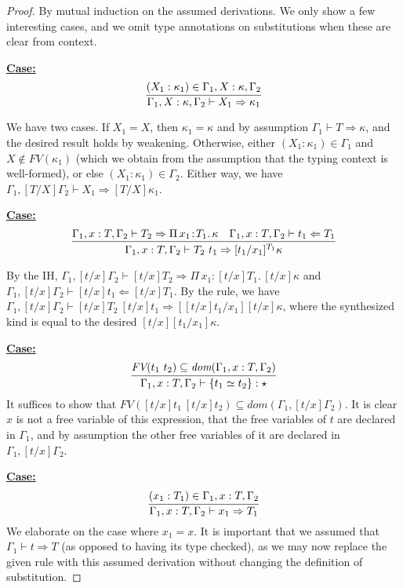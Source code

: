 \documentclass{article}
\newcommand{\abs}[4]{{#1}\, #2\! : \! #3.\, #4}
\newcommand{\tpcheck}[0]{\Leftarrow}
\newcommand{\tpsynth}[0]{\Rightarrow}
\newcommand{\startcase}[1]{\vspace{#1} \noindent\textbf{\underline{Case:}}}
\begin{document}
\begin{proof}
  By mutual induction on the assumed derivations.
  We only show a few interesting cases, and we omit type annotations on
  substitutions when these are clear from context.
  
  \startcase{.2cm}
  \[
    \infer{\Gamma_1,X:\kappa,\Gamma_2 \vdash X_1 \tpsynth \kappa_1}{(X_1 : \kappa_1) \in \Gamma_1,X:\kappa,\Gamma_2}
  \]

  We have two cases.
  If \(X_1 = X\), then \(\kappa_1 = \kappa\) and by assumption \(\Gamma_1 \vdash
  T \tpsynth \kappa\), and the desired result holds by weakening.
  Otherwise, either \((X_1 : \kappa_1) \in \Gamma_1\) and \(X \notin
  \textit{FV}(\kappa_1)\) (which we obtain from the assumption that the typing
  context is well-formed), or else \((X_1 : \kappa_1) \in \Gamma_2\). 
  Either way, we have \(\Gamma_1,[T/X]\Gamma_2 \vdash X_1 \tpsynth
  [T/X]\kappa_1\).

  \startcase{.2cm}
  \[ \infer{\Gamma_1,x:T,\Gamma_2\vdash T_2\ t_1 \tpsynth [t_1/x_1]^{T_1}\kappa
    }{
      \Gamma_1,x:T,\Gamma_2\vdash T_2 \tpsynth \abs{\Pi}{x_1}{T_1}{\kappa}
      & \Gamma_1,x:T,\Gamma_2\vdash t_1 \tpcheck T_1
    }
  \]

  By the IH, \(\Gamma_1,[t/x]\Gamma_2 \vdash [t/x]T_2 \tpsynth
  \abs{\Pi}{x_1}{[t/x]T_1}{[t/x]\kappa}\) and \(\Gamma_1,[t/x]\Gamma_2 \vdash
  [t/x]t_1 \tpcheck [t/x]T_1\).
  By the rule, we have \(\Gamma_1,[t/x]\Gamma_2 \vdash [t/x]T_2\ [t/x]t_1
  \tpsynth [[t/x]t_1/x_1][t/x]\kappa\), where the synthesized kind is equal to
  the desired \([t/x][t_1/x_1]\kappa\).

  \startcase{.2cm}
  \[
    \infer{
      \Gamma_1,x:T,\Gamma_2\vdash \{ t_1 \simeq t_2 \} : \star
    }{
      \textit{FV}(t_1\ t_2)\subseteq\textit{dom}(\Gamma_1,x:T,\Gamma_2)
    }
  \]
  It suffices to show that \(\textit{FV}([t/x]t_1\ [t/x]t_2) \subseteq
  \textit{dom}(\Gamma_1,[t/x]\Gamma_2)\).
  It is clear \(x\) is not a free variable of this expression, that the free
  variables of \(t\) are declared in \(\Gamma_1\), and by assumption the other
  free variables of it are declared in \(\Gamma_1,[t/x]\Gamma_2\).

  \startcase{.2cm}
  \[
    \infer{\Gamma_1,x:T,\Gamma_2 \vdash x_1\tpsynth T_1}{(x_1 : T_1) \in \Gamma_1,x:T,\Gamma_2}
  \]
  We elaborate on the case where \(x_1 = x\).
  It is important that we assumed that \(\Gamma_1 \vdash t \tpsynth T\) (as
  opposed to having its type checked), as we may now replace the given rule with
  this assumed derivation without changing the definition of substitution.


\end{proof}
\end{document}
